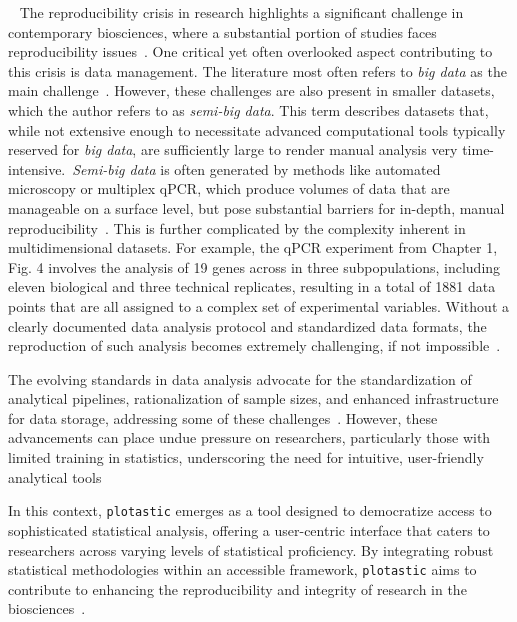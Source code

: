 \label{C2:introduction}
\ %
The reproducibility crisis in research highlights a significant challenge in
contemporary biosciences, where a substantial portion of studies faces
reproducibility issues~\cite{begleyReproducibilityScienceImproving2015}. One
critical yet often overlooked aspect contributing to this crisis is data
management. The literature most often refers to \textit{big data} as the main
challenge~\cite{gomez-cabreroDataIntegrationEra2014}. However, these challenges
are also present in smaller datasets, which the author refers to as
\textit{semi-big data}. This term describes datasets that, while not extensive
enough to necessitate advanced computational tools typically reserved for
\textit{big data}, are sufficiently large to render manual analysis very
time-intensive.~\textit{Semi-big data} is often generated by methods like
automated microscopy or multiplex qPCR, which produce volumes of data that are
manageable on a surface level, but pose substantial barriers for in-depth,
manual reproducibility~\cite{bustinReproducibilityBiomedicalResearch2014}. This
is further complicated by the complexity inherent in multidimensional datasets.
For example, the qPCR experiment from Chapter 1, Fig. 4 involves the analysis of
19 genes across in three subpopulations, including eleven biological and three
technical replicates, resulting in a total of 1881 data points that are all
assigned to a complex set of experimental variables. Without a clearly
documented data analysis protocol and standardized data formats, the
reproduction of such analysis becomes extremely challenging, if not
impossible~\cite{bustinReproducibilityBiomedicalResearch2014}.


The evolving standards in data analysis advocate for the standardization of
analytical pipelines, rationalization of sample sizes, and enhanced
infrastructure for data storage, addressing some of these
challenges~\cite{goodmanWhatDoesResearch2016,wilkinsonFAIRGuidingPrinciples2016}.
However, these advancements can place undue pressure on researchers,
particularly those with limited training in statistics, underscoring the need
for intuitive, user-friendly analytical
tools~\cite{gosselinInsufficientTransparencyStatistical2021,armstrongWhenUseBonferroni2014,gomez-lopezPrecisionMedicineNeeds2019}

In this context, \texttt{plotastic} emerges as a tool designed to democratize access to
sophisticated statistical analysis, offering a user-centric interface that
caters to researchers across varying levels of statistical proficiency. By
integrating robust statistical methodologies within an accessible framework,
\texttt{plotastic} aims to contribute to enhancing the reproducibility and
integrity of research in the biosciences~\cite{gomez-cabreroDataIntegrationEra2014}.



